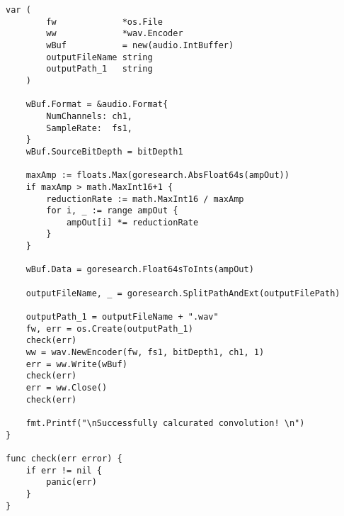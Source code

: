 \begin{lstlisting}[caption=cmd/convolve_wav/main.go,label=convolve_wav]
	var (
		fw             *os.File
		ww             *wav.Encoder
		wBuf           = new(audio.IntBuffer)
		outputFileName string
		outputPath_1   string
	)

	wBuf.Format = &audio.Format{
		NumChannels: ch1,
		SampleRate:  fs1,
	}
	wBuf.SourceBitDepth = bitDepth1

	maxAmp := floats.Max(goresearch.AbsFloat64s(ampOut))
	if maxAmp > math.MaxInt16+1 {
		reductionRate := math.MaxInt16 / maxAmp
		for i, _ := range ampOut {
			ampOut[i] *= reductionRate
		}
	}

	wBuf.Data = goresearch.Float64sToInts(ampOut)

	outputFileName, _ = goresearch.SplitPathAndExt(outputFilePath)

	outputPath_1 = outputFileName + ".wav"
	fw, err = os.Create(outputPath_1)
	check(err)
	ww = wav.NewEncoder(fw, fs1, bitDepth1, ch1, 1)
	err = ww.Write(wBuf)
	check(err)
	err = ww.Close()
	check(err)

	fmt.Printf("\nSuccessfully calcurated convolution! \n")
}

func check(err error) {
	if err != nil {
		panic(err)
	}
}
\end{lstlisting}

